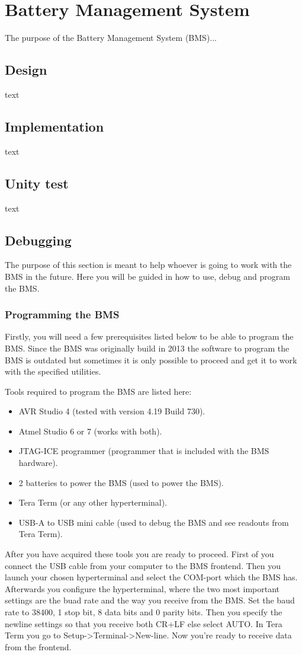 \section{Battery Management System}
The purpose of the Battery Management System (BMS)...

\subsection{Design}
text

\subsection{Implementation}
text

\subsection{Unity test}
text

\subsection{Debugging}
The purpose of this section is meant to help whoever is going to work with the BMS in the future. Here you will be guided in how to use, debug and program the BMS.

\subsubsection{Programming the BMS}
Firstly, you will need a few prerequisites listed below to be able to program the BMS. Since the BMS was originally build in 2013 the software to program the BMS is outdated but sometimes it is only possible to proceed and get it to work with the specified utilities. 

Tools required to program the BMS are listed here:
	\begin{itemize}
		\item AVR Studio 4 (tested with version 4.19 Build 730).
		\item Atmel Studio 6 or 7 (works with both).
		\item JTAG-ICE programmer	(programmer that is included with the BMS hardware).
		\item 2 batteries to power the BMS (used to power the BMS).
		\item Tera Term (or any other hyperterminal).
		\item USB-A to USB mini cable	(used to debug the BMS and see readouts from Tera Term).
	\end{itemize}
After you have acquired these tools you are ready to proceed. First of you connect the USB cable from your computer to the BMS frontend. Then you launch your chosen hyperterminal and select the COM-port which the BMS has. Afterwards you configure the hyperterminal, where the two most important settings are the buad rate and the way you receive from the BMS. Set the baud rate to 38400, 1 stop bit, 8 data bits and 0 parity bits. Then you specify the newline settings so that you receive both CR+LF else select AUTO. In Tera Term you go to Setup->Terminal->New-line. 
Now you're ready to receive data from the frontend. 